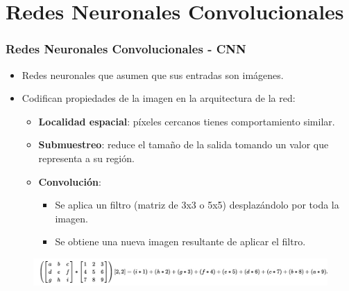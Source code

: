 \documentclass[10pt,center]{beamer}
\begin{document}
\section{Redes Neuronales Convolucionales}
\begin{frame}
  \frametitle{Redes Neuronales Convolucionales - CNN}
    \begin{itemize}
      \item Redes neuronales que asumen que sus entradas son imágenes.
      \item Codifican propiedades de la imagen en la arquitectura de la red:
      \begin{itemize}
	\item \textbf{Localidad espacial}: píxeles cercanos tienes comportamiento similar.
	\item \textbf{Submuestreo}: reduce el tamaño de la salida tomando un valor que representa a su región.
	\item \textbf{Convolución}:
	  \begin{itemize}
	    \item Se aplica un filtro (matriz de 3x3 o 5x5) desplazándolo por toda la imagen.
	    \item Se obtiene una nueva imagen resultante de aplicar el filtro.
	  \end{itemize}
      \end{itemize}
    \end{itemize}
    \begin{figure}[h]
      \begin{center}
      \includegraphics[width=\textwidth]{./img/convolution_wiki.jpg}
      \end{center}
    \end{figure}
\end{frame}
  
\end{document}
